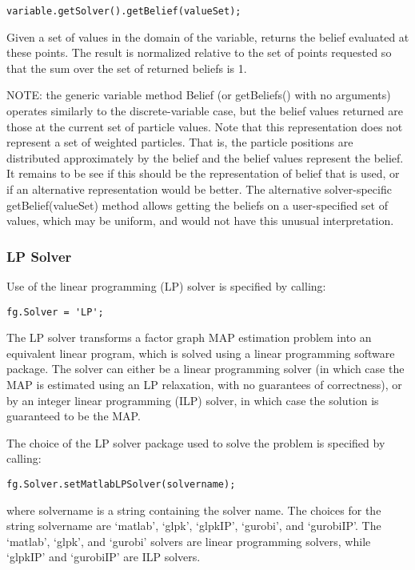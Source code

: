 \ifjava
\begin{lstlisting}
variable.getSolver().getBelief(valueSet);
\end{lstlisting}
\fi

Given a set of values in the domain of the variable, returns the belief evaluated at these points. The result is normalized relative to the set of points requested so that the sum over the set of returned beliefs is 1.

NOTE: the generic variable method Belief (or getBeliefs() with no arguments) operates similarly to the discrete-variable case, but the belief values returned are those at the current set of particle values. Note that this representation does not represent a set of weighted particles. That is, the particle positions are distributed approximately by the belief and the belief values represent the belief. It remains to be see if this should be the representation of belief that is used, or if an alternative representation would be better. The alternative solver-specific getBelief(valueSet) method allows getting the beliefs on a user-specified set of values, which may be uniform, and would not have this unusual interpretation.



\subsubsection{LP Solver}
\label{sec:LPSolver}

\ifmatlab
Use of the linear programming (LP) solver is specified by calling:

\begin{lstlisting}
fg.Solver = 'LP';
\end{lstlisting}

The LP solver transforms a factor graph MAP estimation problem into an equivalent linear program, which is solved using a linear programming software package. The solver can either be a linear programming solver (in which case the MAP is estimated using an LP relaxation, with no guarantees of correctness), or by an integer linear programming (ILP) solver, in which case the solution is guaranteed to be the MAP. 

The choice of the LP solver package used to solve the problem is specified by calling:
\begin{lstlisting}
fg.Solver.setMatlabLPSolver(solvername);
\end{lstlisting}
where solvername is a string containing the solver name. The choices for the string solvername are `matlab', `glpk', `glpkIP', `gurobi', and `gurobiIP'. The `matlab', `glpk', and `gurobi' solvers are linear programming solvers, while `glpkIP' and `gurobiIP' are ILP solvers.

